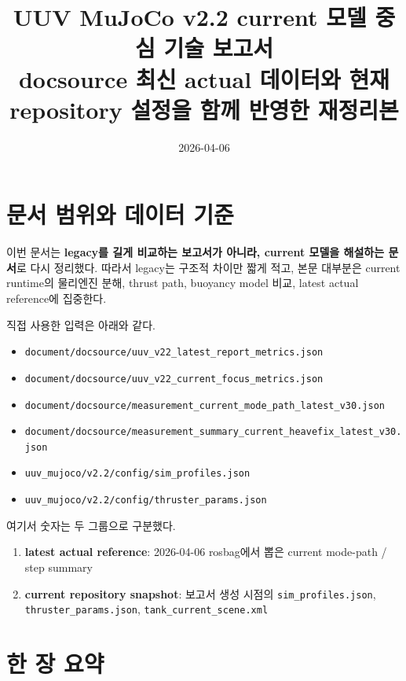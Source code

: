 \documentclass[11pt,a4paper]{article}
\title{UUV MuJoCo v2.2 current 모델 중심 기술 보고서\\
\large docsource 최신 actual 데이터와 현재 repository 설정을 함께 반영한 재정리본}
\author{}
\date{2026-04-06}
\newcommand{\code}[1]{\nolinkurl{#1}}
\begin{document}
\maketitle
\tableofcontents
\clearpage

\section{문서 범위와 데이터 기준}

이번 문서는 \textbf{legacy를 길게 비교하는 보고서가 아니라, current 모델을 해설하는 문서}로 다시 정리했다. 따라서 legacy는 구조적 차이만 짧게 적고, 본문 대부분은 current runtime의 물리엔진 분해, thrust path, buoyancy model 비교, latest actual reference에 집중한다.

직접 사용한 입력은 아래와 같다.

\begin{itemize}[leftmargin=2em]
  \item \code{document/docsource/uuv_v22_latest_report_metrics.json}
  \item \code{document/docsource/uuv_v22_current_focus_metrics.json}
  \item \code{document/docsource/measurement_current_mode_path_latest_v30.json}
  \item \code{document/docsource/measurement_summary_current_heavefix_latest_v30.json}
  \item \code{uuv_mujoco/v2.2/config/sim_profiles.json}
  \item \code{uuv_mujoco/v2.2/config/thruster_params.json}
\end{itemize}

여기서 숫자는 두 그룹으로 구분했다.

\begin{enumerate}[leftmargin=2em]
  \item \textbf{latest actual reference}: 2026-04-06 rosbag에서 뽑은 current mode-path / step summary
  \item \textbf{current repository snapshot}: 보고서 생성 시점의 \code{sim\_profiles.json}, \code{thruster\_params.json}, \code{tank\_current\_scene.xml}
\end{enumerate}

\section{한 장 요약}
\end{document}
